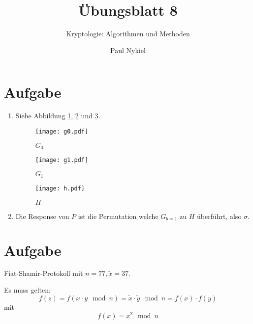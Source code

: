 \documentclass[DIN, pagenumber=false, fontsize=11pt, parskip=half]{scrartcl}
\title{Übungsblatt 8}
\subtitle{Kryptologie: Algorithmen und Methoden}
\author{Paul Nykiel}
\begin{document}
    \maketitle
    \section{Aufgabe}
    \begin{enumerate}[label=\alph*)]
        \item Siehe Abbildung \ref{fig:g0}, \ref{fig:g1} und \ref{fig:h}.
            \begin{figure}[H]
                \centering
                \texttt{[image: g0.pdf]}
                \caption{$G_0$} 
                \label{fig:g0}
            \end{figure}
            \begin{figure}[H]
                \centering
                \texttt{[image: g1.pdf]}
                \caption{$G_1$} 
                \label{fig:g1}
            \end{figure}
            \begin{figure}[H]
                \centering
                \texttt{[image: h.pdf]}
                \caption{$H$} 
                \label{fig:h}
            \end{figure}
        \item Die Response von $P$ ist die Permutation welche $G_{b=1}$ zu
            $H$ überführt, also $\sigma$.
    \end{enumerate}

    \section{Aufgabe}
    Fiat-Shamir-Protokoll mit $n=77, \tilde{x}=37$.

    Es muss gelten:
    \begin{equation}
        f(z) = f(x \cdot y \mod n) = \tilde{x} \cdot \tilde{y} \mod n = f(x) \cdot f(y)
    \end{equation}
    mit
    \begin{equation}
        f(x) = x^2 \mod n
    \end{equation}
\end{document}
